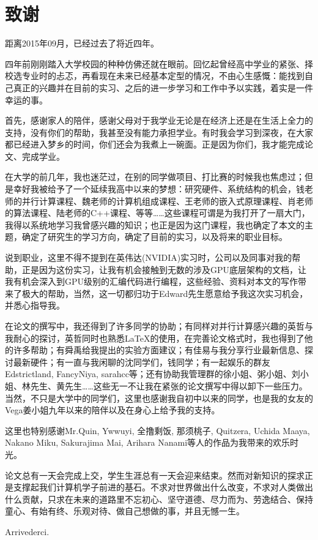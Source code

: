 \clearpage                              %
\section*{致谢}                         %
\par 距离2015年09月，已经过去了将近四年。
\par 四年前刚刚踏入大学校园的种种仿佛还就在眼前。回忆起曾经高中学业的紧张、择校选专业时的忐忑，再看现在未来已经基本定型的情况，不由心生感慨：能找到自己真正的兴趣并在目前的实习、之后的进一步学习和工作中予以实践，着实是一件幸运的事。
\par 首先，感谢家人的陪伴，感谢父母对于我学业无论是在经济上还是在生活上全力的支持，没有你们的帮助，我甚至没有能力承担学业。有时我会学习到深夜，在大家都已经进入梦乡的时间，你们还会为我煮上一碗面。正是因为你们，我才能完成论文、完成学业。
\par 在大学的前几年，我也迷茫过，在别的同学做项目、打比赛的时候我也焦虑过；但是幸好我被给予了一个延续我高中以来的梦想：研究硬件、系统结构的机会，钱老师的并行计算课程、魏老师的计算机组成课程、王老师的嵌入式原理课程、肖老师的算法课程、陆老师的C++课程、等等……这些课程可谓是为我打开了一扇大门，我得以系统地学习我曾感兴趣的知识；也正是因为这门课程，我也确定了本文的主题，确定了研究生的学习方向，确定了目前的实习，以及将来的职业目标。
\par 说到职业，这里不得不提到在英伟达(NVIDIA)实习时，公司以及同事对我的帮助，正是因为这份实习，让我有机会接触到无数的涉及GPU底层架构的文档，让我有机会深入到GPU级别的汇编代码进行编程，这些经验、资料对本文的写作带来了极大的帮助，当然，这一切都归功于Edward先生愿意给予我这次实习机会，并悉心指导我。
\par 在论文的撰写中，我还得到了许多同学的协助；有同样对并行计算感兴趣的英哲与我耐心的探讨，英哲同时也熟悉\LaTeX 的使用，在完善论文格式时，我也得到了他的许多帮助；有舜禹给我提出的实验方面建议；有佳易与我分享行业最新信息、探讨最新硬件；有一直与我闲聊的沈同学们，钱同学；有一起娱乐的群友Edstrictland, FancyNiya, sarahcc等；还有协助我管理群的徐小姐、粥小姐、刘小姐、林先生、黄先生……这些无一不让我在紧张的论文撰写中得以卸下一些压力。当然，不只是大学中的同学们，这里也感谢我自初中以来的同学，也是我的女友的Vega姜小姐九年以来的陪伴以及在身心上给予我的支持。
\par 这里也特别感谢Mr.Quin, Ywwuyi, 全撸剩饭, 那须桃子, Quitzera, Uchida Maaya, Nakano Miku, Sakurajima Mai, Arihara Nanami等人的作品为我带来的欢乐时光。
\par 论文总有一天会完成上交，学生生涯总有一天会迎来结束。然而对新知识的探求正是支撑起我们计算机学子前进的基石。不求对世界做出什么改变，不求对人类做出什么贡献，只求在未来的道路里不忘初心、坚守道德、尽力而为、劳逸结合、保持童心、有始有终、乐观对待、做自己想做的事，并且无憾一生。
\par Arrivederci.
